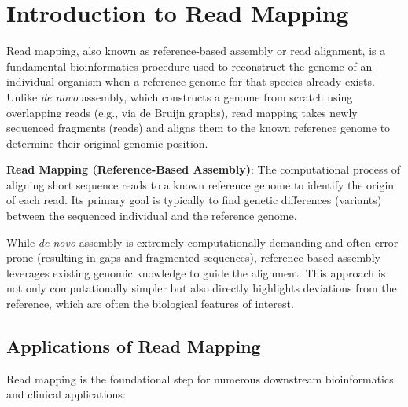 
\section{Introduction to Read Mapping}

Read mapping, also known as reference-based assembly or read alignment, is a fundamental bioinformatics procedure used to reconstruct the genome of an individual organism when a reference genome for that species already exists. Unlike \textit{de novo} assembly, which constructs a genome from scratch using overlapping reads (e.g., via de Bruijn graphs), read mapping takes newly sequenced fragments (reads) and aligns them to the known reference genome to determine their original genomic position.

\begin{important}
    \textbf{Read Mapping (Reference-Based Assembly)}: The computational process of aligning short sequence reads to a known reference genome to identify the origin of each read. Its primary goal is typically to find genetic differences (variants) between the sequenced individual and the reference genome.
\end{important}

While \textit{de novo} assembly is extremely computationally demanding and often error-prone (resulting in gaps and fragmented sequences), reference-based assembly leverages existing genomic knowledge to guide the alignment. This approach is not only computationally simpler but also directly highlights deviations from the reference, which are often the biological features of interest.

\subsection{Applications of Read Mapping}

Read mapping is the foundational step for numerous downstream bioinformatics and clinical applications:

